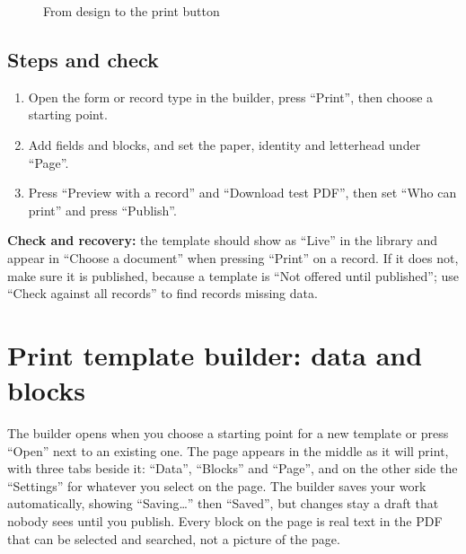 \begin{figure}[H]
\centering
{}
\rclegend
\caption{From design to the print button}
\label{fig:builder-print-flow}
\end{figure}

\subsection{Steps and check}
\begin{enumerate}
\item Open the form or record type in the builder, press “Print”, then choose a starting point.
\item Add fields and blocks, and set the paper, identity and letterhead under “Page”.
\item Press “Preview with a record” and “Download test PDF”, then set “Who can print” and press “Publish”.
\end{enumerate}

\textbf{Check and recovery:} the template should show as “Live” in the library and appear in “Choose a document” when pressing “Print” on a record. If it does not, make sure it is published, because a template is “Not offered until published”; use “Check against all records” to find records missing data.

\clearpage
\section{Print template builder: data and blocks}
\label{sec:builder-feature-print-builder}

The builder opens when you choose a starting point for a new template or press “Open” next to an existing one. The page appears in the middle as it will print, with three tabs beside it: “Data”, “Blocks” and “Page”, and on the other side the “Settings” for whatever you select on the page. The builder saves your work automatically, showing “Saving…” then “Saved”, but changes stay a draft that nobody sees until you publish. Every block on the page is real text in the PDF that can be selected and searched, not a picture of the page.

